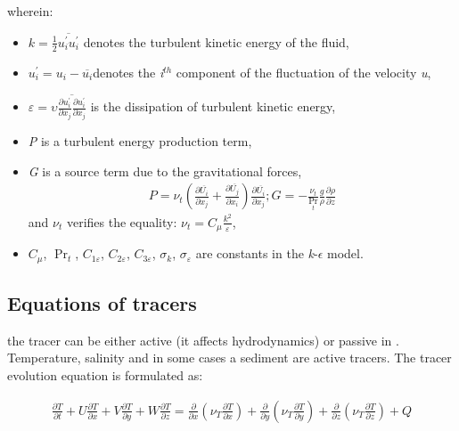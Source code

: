 wherein:
\begin{itemize}
\item $k=\frac{1}{2} \overline{u_{i}^{'} u_{i}^{'} }$ denotes the turbulent
kinetic energy of the fluid,

\item $u_{i}^{'} =u_{i} -\overline{u_{i} }$denotes the \textit{i}${}^{th}$ component
of the fluctuation of the velocity \textit{u},

\item $\varepsilon =\upsilon \overline{\frac{\partial u_{i}^{'} }{\partial
x_{j} } \frac{\partial u_{i}^{'} }{\partial x_{j} } }$ is the dissipation of
turbulent kinetic energy,

\item \textit{P} is a turbulent energy production term,

\item \textit{G} is a source term due to the gravitational forces,
\begin{align}
P=\nu _{t} \left(\frac{\partial \overline{U_{i}
}}{\partial x_{j} } +\frac{\partial \overline{U_{j} }}{\partial x_{i} }
\right)\frac{\partial \overline{U_{i} }}{\partial x_{j} } ; G = -
\frac{\nu _{t} }{\Pr _{t} } \frac{g}{\rho } \frac{\partial \rho
}{\partial z}
\end{align}
and $\nu _{t} $ verifies the equality: $\nu _{t} =C_{\mu }
\frac{k^{2} }{\varepsilon } $,

\item $C_{\mu }$, $\Pr _{t}$, $C_{1\varepsilon }$, $C_{2\varepsilon }$,
$C_{3\varepsilon }$,  $\sigma _{k}$, $\sigma _{\varepsilon }$ are constants in
the \textit{k}-$\epsilon$ model.
\end{itemize}

\subsection{Equations of tracers}

the tracer can be either active (it affects hydrodynamics) or passive in
. Temperature, salinity and in some cases a sediment are active
tracers. The tracer evolution equation is formulated as:

\begin{align}
\frac{\partial T}{\partial t} +U\frac{\partial T}{\partial x}
+V\frac{\partial T}{\partial y} +W\frac{\partial T}{\partial z}
=\frac{\partial }{\partial x}
\left(\nu _{T} \frac{\partial T}{\partial x} \right)
+\frac{\partial }{\partial y}
\left(\nu _{T} \frac{\partial T}{\partial y} \right)
+\frac{\partial }{\partial z}
\left(\nu _{T} \frac{\partial T}{\partial z} \right)+Q
\end{align}

